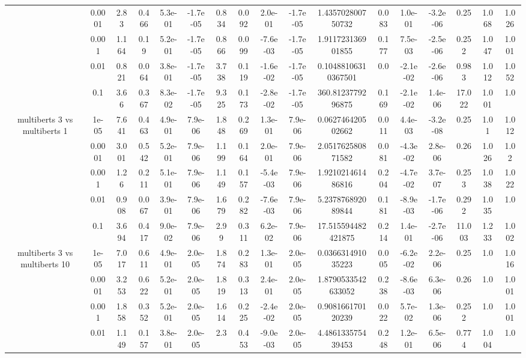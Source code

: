 \begin{tabular}{|c|c|c|c|c|c|c|c|c|c|c|c|c|c|c|c|c|}
 & 0.0001 & 2.83 & 0.466 & 5.3e-01 & -1.7e-05 & 0.834 & 0.092 & 2.0e-01 & -1.7e-05 & 1.435702800750732 & 0.083 & 1.0e-01 & -3.2e-06 & 0.25 & 1.068 & 1.026 \\
 & 0.001 & 1.164 & 0.19 & 5.2e-01 & -1.7e-05 & 0.866 & 0.099 & -7.6e-03 & -1.7e-05 & 1.911723136901855 & 0.177 & 7.5e-03 & -2.5e-06 & 0.252 & 1.047 & 1.001 \\
 & 0.01 & 0.821 & 0.064 & 3.8e-01 & -1.7e-05 & 3.738 & 0.119 & -1.6e-02 & -1.7e-05 & 0.10488106310367501 & 0.0 & -2.1e-02 & -2.6e-06 & 0.983 & 1.012 & 1.052 \\
 & 0.1 & 3.66 & 0.367 & 8.3e-02 & -1.7e-05 & 9.325 & 0.173 & -2.8e-02 & -1.7e-05 & 360.8123779296875 & 0.169 & -2.1e-02 & 1.4e-06 & 17.022 & 1.001 & 1.0 \\
\hline
\multirow{5}{*}{multiberts 3 vs multiberts 1} & 1e-05 & 7.641 & 0.463 & 4.9e-01 & 7.9e-06 & 1.848 & 0.269 & 1.3e-01 & 7.9e-06 & 0.062746420502662 & 0.011 & 4.4e-03 & -3.2e-08 & 0.25 & 1.01 & 1.012 \\
 & 0.0001 & 3.001 & 0.542 & 5.2e-01 & 7.9e-06 & 1.199 & 0.164 & 2.0e-01 & 7.9e-06 & 2.051762580871582 & 0.081 & -4.3e-02 & 2.8e-06 & 0.26 & 1.026 & 1.02 \\
 & 0.001 & 1.26 & 0.211 & 5.1e-01 & 7.9e-06 & 1.149 & 0.157 & -5.4e-03 & 7.9e-06 & 1.921021461486816 & 0.204 & -4.7e-02 & 3.7e-07 & 0.253 & 1.038 & 1.022 \\
 & 0.01 & 0.908 & 0.067 & 3.9e-01 & 7.9e-06 & 1.679 & 0.282 & -7.6e-03 & 7.9e-06 & 5.237876892089844 & 0.181 & -8.9e-03 & -1.7e-06 & 0.292 & 1.035 & 1.0 \\
 & 0.1 & 3.694 & 0.417 & 9.0e-02 & 7.9e-06 & 2.99 & 0.311 & 6.2e-02 & 7.9e-06 & 17.515594482421875 & 0.214 & 1.4e-01 & -2.7e-06 & 11.003 & 1.233 & 1.002 \\
\hline
\multirow{5}{*}{multiberts 3 vs multiberts 10} & 1e-05 & 7.017 & 0.611 & 4.9e-01 & 2.0e-05 & 1.874 & 0.283 & 1.3e-01 & 2.0e-05 & 0.036631491035223 & 0.005 & -6.2e-02 & 2.2e-06 & 0.25 & 1.0 & 1.016 \\
 & 0.0001 & 3.253 & 0.622 & 5.2e-01 & 2.0e-05 & 1.819 & 0.313 & 2.4e-01 & 2.0e-05 & 1.8790533542633052 & 0.238 & -8.6e-03 & 6.3e-06 & 0.26 & 1.0 & 1.001 \\
 & 0.001 & 1.858 & 0.352 & 5.2e-01 & 2.0e-05 & 1.614 & 0.225 & -2.4e-02 & 2.0e-05 & 0.908166170120239 & 0.022 & 5.7e-02 & 1.3e-06 & 0.252 & 1.0 & 1.001 \\
 & 0.01 & 1.149 & 0.157 & 3.8e-01 & 2.0e-05 & 2.3 & 0.453 & -9.0e-03 & 2.0e-05 & 4.486133575439453 & 0.248 & 1.2e-01 & 6.5e-06 & 0.774 & 1.004 & 1.0 \\

\end{tabular}
